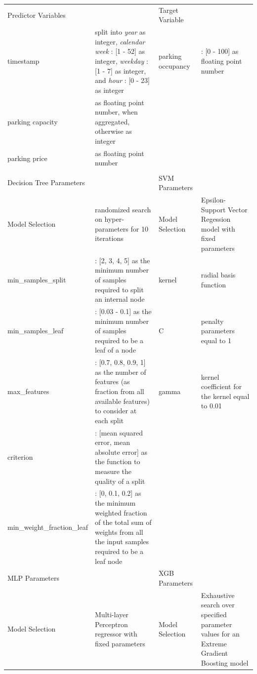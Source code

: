 \documentclass{ws-ijait}
\begin{document}
	\begin{table}
		{\begin{tabular}{lp{4cm}lp{4cm}}	
				\toprule
				Predictor Variables & & Target Variable & \\
				\colrule
				timestamp & split into \textit{year} as integer, \textit{calendar week} : [1 - 52] as integer, \textit{weekday} : [1 - 7] as integer, and \textit{hour} : [0 - 23] as integer & parking occupancy & : [0 - 100] as floating point number \\
				parking capacity & as floating point number, when aggregated, otherwise as integer & & \\
				parking price & as floating point number & & \\
				&  & & \\
				\colrule
				Decision Tree Parameters & & SVM Parameters & \\
				\colrule
				Model Selection & randomized search on hyper-parameters for 10 iterations & Model Selection & Epsilon-Support Vector Regession model with fixed parameters \\
				min\_samples\_split & : [2, 3, 4, 5] as the minimum number of samples required to split an internal node & kernel & radial basis function \\
				min\_samples\_leaf & : [0.03 - 0.1] as the minimum number of samples required to be a leaf of a node & C & penalty parameters equal to 1 \\
				max\_features & : [0.7, 0.8, 0.9, 1] as the number of features (as fraction from all available features) to consider at each split & gamma & kernel coefficient for the kernel equal to 0.01 \\
				criterion & : [mean squared error, mean absolute error] as the function to measure the quality of a split &  &  \\
				min\_weight\_fraction\_leaf & : [0, 0.1, 0.2] as the minimum weighted fraction of the total sum of weights from all the input samples required to be a leaf node & & \\
				\colrule
				MLP Parameters & & XGB Parameters & \\
				\colrule
				Model Selection & Multi-layer Perceptron regressor with fixed parameters & Model Selection & Exhaustive search over specified parameter values for an Extreme Gradient Boosting model \\
				

\end{tabular}}
\end{table}
\end{document}
